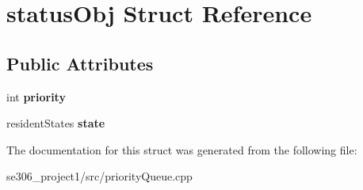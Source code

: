 \hypertarget{structstatusObj}{\section{status\-Obj Struct Reference}
\label{structstatusObj}
}
\subsection*{Public Attributes}
\begin{DoxyCompactItemize}
\item 
\hypertarget{structstatusObj_a133b14a8f17b2b31d52ecf6ef6a8fe6e}{int {\bfseries priority}}\label{structstatusObj_a133b14a8f17b2b31d52ecf6ef6a8fe6e}

\item 
\hypertarget{structstatusObj_a65ed97f7deaf094ed3640b26a3527588}{resident\-States {\bfseries state}}\label{structstatusObj_a65ed97f7deaf094ed3640b26a3527588}

\end{DoxyCompactItemize}


The documentation for this struct was generated from the following file\-:\begin{DoxyCompactItemize}
\item 
se306\-\_\-project1/src/priority\-Queue.\-cpp\end{DoxyCompactItemize}
